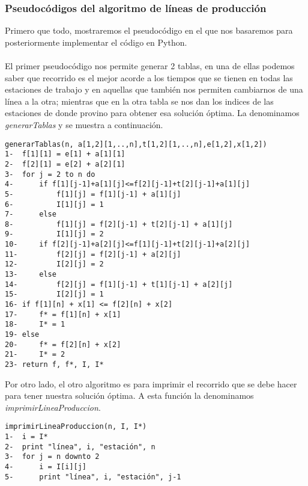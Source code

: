 \documentclass[12pt,twoside]{article}
\begin{document}
\subsubsection{Pseudocódigos del algoritmo de líneas de producción}
Primero que todo, mostraremos el pseudocódigo en el que nos basaremos para posteriormente implementar el código en Python.\\\\
El primer pseudocódigo nos permite generar 2 tablas, en una de ellas podemos saber que recorrido es el mejor acorde a los tiempos que se tienen en todas las estaciones de trabajo y en aquellas que también nos permiten cambiarnos de una línea a la otra; mientras que en la otra tabla se nos dan los indices de las estaciones de donde provino para obtener esa solución óptima. La denominamos \textit{generarTablas} y se muestra a continuación.
\begin{lstlisting}
generarTablas(n, a[1,2][1,..,n],t[1,2][1,..,n],e[1,2],x[1,2])
1-  f[1][1] = e[1] + a[1][1]
2-  f[2][1] = e[2] + a[2][1]
3-  for j = 2 to n do
4-      if f[1][j-1]+a[1][j]<=f[2][j-1]+t[2][j-1]+a[1][j]
5-          f[1][j] = f[1][j-1] + a[1][j]
6-          I[1][j] = 1
7-      else
8-          f[1][j] = f[2][j-1] + t[2][j-1] + a[1][j]
9-          I[1][j] = 2
10-     if f[2][j-1]+a[2][j]<=f[1][j-1]+t[2][j-1]+a[2][j]
11-         f[2][j] = f[2][j-1] + a[2][j]
12-         I[2][j] = 2
13-     else
14-         f[2][j] = f[1][j-1] + t[1][j-1] + a[2][j]
15-         I[2][j] = 1
16- if f[1][n] + x[1] <= f[2][n] + x[2]
17-     f* = f[1][n] + x[1]
18-     I* = 1
19- else
20-     f* = f[2][n] + x[2]
21-     I* = 2
23- return f, f*, I, I*
\end{lstlisting}
Por otro lado, el otro algoritmo es para imprimir el recorrido que se debe hacer para tener nuestra solución óptima. A esta función la denominamos \textit{imprimirLineaProduccion}.
\begin{lstlisting}
imprimirLineaProduccion(n, I, I*)
1-  i = I*
2-  print "línea", i, "estación", n
3-  for j = n downto 2
4-      i = I[i][j]
5-      print "línea", i, "estación", j-1
\end{lstlisting}
\end{document}
